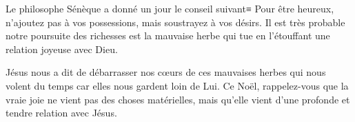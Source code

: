 Le philosophe Sénèque a donné un jour le conseil suivant≡ \og Pour être heureux, n'ajoutez pas à vos possessions, mais soustrayez à vos désirs. \fg{} Il est très probable notre poursuite des richesses est la mauvaise herbe qui tue en l'étouffant une relation joyeuse avec Dieu.


Jésus nous a dit de débarrasser nos cœurs de ces mauvaises herbes qui nous volent du temps car elles nous gardent loin de Lui. Ce Noël, rappelez-vous que la vraie joie ne vient pas des choses matérielles, mais qu'elle vient d'une profonde et tendre relation avec Jésus.

\pagebreak

\ornrule


\ornrule


